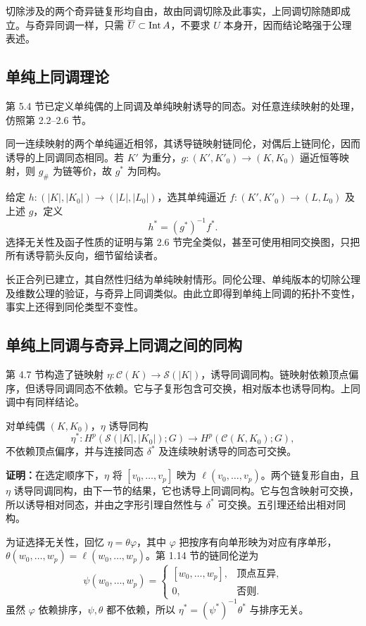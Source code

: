 切除涉及的两个奇异链复形均自由，故由同调切除及此事实，上同调切除随即成立。与奇异同调一样，只需 $\overline U\subset\operatorname{Int} A$，不要求 $U$ 本身开，因而结论略强于公理表述。

\subsection*{单纯上同调理论}
第 5.4 节已定义单纯偶的上同调及单纯映射诱导的同态。对任意连续映射的处理，仿照第 2.2--2.6 节。

同一连续映射的两个单纯逼近相邻，其诱导链映射链同伦，对偶后上链同伦，因而诱导的上同调同态相同。若 $K'$ 为重分，$g:(K',K'_0)\to(K,K_0)$ 逼近恒等映射，则 $g_\#$ 为链等价，故 $g^*$ 为同构。

给定 $h:(|K|,|K_0|)\to(|L|,|L_0|)$，选其单纯逼近 $f:(K',K'_0)\to(L,L_0)$ 及上述 $g$，定义
\[
h^*=(g^*)^{-1}f^*.
\]
选择无关性及函子性质的证明与第 2.6 节完全类似，甚至可使用相同交换图，只把所有诱导箭头反向，细节留给读者。

长正合列已建立，其自然性归结为单纯映射情形。同伦公理、单纯版本的切除公理及维数公理的验证，与奇异上同调类似。由此立即得到单纯上同调的拓扑不变性，事实上还得到同伦类型不变性。

\subsection*{单纯上同调与奇异上同调之间的同构}
第 4.7 节构造了链映射 $\eta:\mathcal C(K)\to\mathcal S(|K|)$，诱导同调同构。链映射依赖顶点偏序，但诱导同调同态不依赖。它与子复形包含可交换，相对版本也诱导同构。上同调中有同样结论。

对单纯偶 $(K,K_0)$，$\eta$ 诱导同构
\[
\eta^*:H^p(\mathcal S(|K|,|K_0|);G)\to H^p(\mathcal C(K,K_0);G),
\]
不依赖顶点偏序，并与连接同态 $\delta^*$ 及连续映射诱导的同态可交换。

\textbf{证明：}在选定顺序下，$\eta$ 将 $[v_0,\ldots,v_p]$ 映为 $\ell(v_0,\ldots,v_p)$。两个链复形自由，且 $\eta$ 诱导同调同构，由下一节的结果，它也诱导上同调同构。它与包含映射可交换，所以诱导相对同态，并由之字形引理自然性与 $\delta^*$ 可交换。五引理还给出相对同构。

为证选择无关性，回忆 $\eta=\theta\varphi$，其中 $\varphi$ 把按序有向单形映为对应有序单形，$\theta(w_0,\ldots,w_p)=\ell(w_0,\ldots,w_p)$。第 1.14 节的链同伦逆为
\[
\psi(w_0,\ldots,w_p)=\begin{cases}[w_0,\ldots,w_p],&\text{顶点互异},\\0,&\text{否则}.\end{cases}
\]
虽然 $\varphi$ 依赖排序，$\psi,\theta$ 都不依赖，所以 $\eta^*=(\psi^*)^{-1}\theta^*$ 与排序无关。

